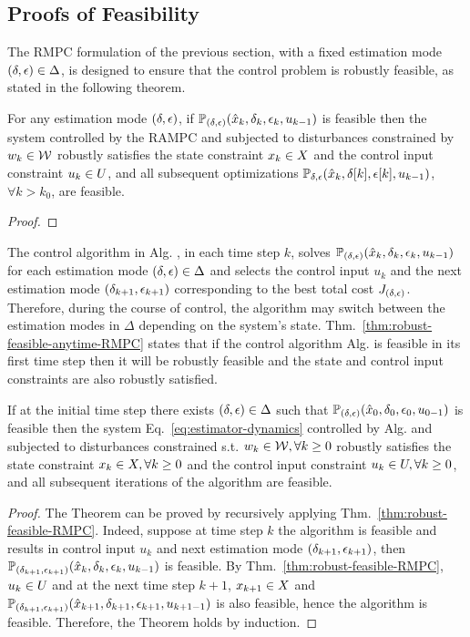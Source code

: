 \subsection{Proofs of Feasibility}
The RMPC formulation of the previous section, with a fixed estimation mode
$\left(\delta,\epsilon\right)\in\Delta$, is designed to ensure that the control problem is robustly feasible, as stated in the following theorem.
\begin{thm}
\label{thm:robust-feasible-RMPC} For
any estimation mode $\left(\delta,\epsilon\right)$, if $\mathbb{P}_{(\delta,\epsilon)}(\hat{x}_{k},\delta_{k},\epsilon_{k},u_{k -1})$
is feasible then the system \discDynEeq controlled by
the RAMPC and subjected to disturbances constrained by $w_k \in \mathcal{W}$
robustly satisfies the state constraint $x_k \in X$
and the control input constraint $u_k \in U$, and
all subsequent optimizations $\mathbb{P_{\delta,\epsilon}}(\hat{x}_{k},\delta[k],\epsilon[k],u_{k-1})$,
$\forall k>k_{0}$, are feasible.
\end{thm}
\begin{proof}

\end{proof}
The control algorithm in Alg. \algoref, in each time step $k$, solves $\mathbb{P}_{(\delta,\epsilon)}(\hat{x}_{k},\delta_{k},\epsilon_{k},u_{k -1})$ for each estimation mode $(\delta,\epsilon) \in\Delta$ and selects the control input $u_{k}$ and the next estimation mode $(\delta_{k+1},\epsilon_{k+1})$
corresponding to the best total cost $J_{(\delta,\epsilon)}$.
Therefore, during the course of control, the algorithm may switch between the estimation modes in $\Delta$ depending on the system's state. Thm.~\ref{thm:robust-feasible-anytime-RMPC} states that if the control algorithm Alg. \algoref is feasible in its first time step then it will be robustly feasible and the state and control input constraints are also robustly satisfied.
\begin{thm}%
\label{thm:robust-feasible-anytime-RMPC}
If at the initial time step there exists $\left(\delta,\epsilon\right)\in\Delta$
such that $\mathbb{P}_{(\delta,\epsilon)}(\hat{x}_{0},\delta_{0},\epsilon_{0},u_{0 -1})$
is feasible then the system Eq.~\ref{eq:estimator-dynamics} controlled by
Alg. \algoref and subjected to disturbances constrained
s.t. $w_k\in \mathcal{W},\forall k\geq0$ robustly satisfies the state constraint
$x_k\in X,\forall k\geq0$ and the control input constraint $u_k\in U,\forall k\geq0$,
and all subsequent iterations of the algorithm are feasible.
\end{thm}
\begin{proof}
The Theorem can be proved by recursively applying Thm.~\ref{thm:robust-feasible-RMPC}.
Indeed, suppose at time step $k$ the algorithm
is feasible and results in control input $u_{k}$ and next estimation
mode $(\delta_{k+1},\epsilon_{k+1})$, then $\mathbb{P}_{(\delta_{k+1},\epsilon_{k+1})}(\hat{x}_{k},\delta_{k},\epsilon_{k},u_{k -1})$
is feasible. By Thm.~\ref{thm:robust-feasible-RMPC}, $u_{k}\in U$ and
at the next time step $k+1$, $x_{k+1}\in X$ and $\mathbb{P}_{(\delta_{k+1},\epsilon_{k+1})}(\hat{x}_{k+1},\delta_{k+1},\epsilon_{k+1},u_{k+1 -1})$
is also feasible, hence the algorithm is feasible.
Therefore, the Theorem holds by induction.
\end{proof}


